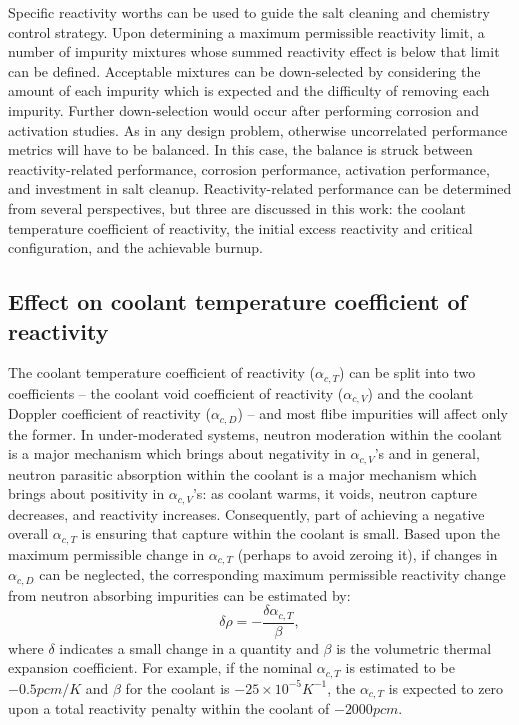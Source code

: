 \documentclass[11pt]{article}
\begin{document}
Specific reactivity worths can be used to guide the salt cleaning and chemistry control strategy.
Upon determining a maximum permissible reactivity limit, a number of impurity mixtures whose summed reactivity effect is below that limit can be defined.
Acceptable mixtures can be down-selected by considering the amount of each impurity which is expected and the difficulty of removing each impurity.
Further down-selection would occur after performing corrosion and activation studies.
As in any design problem, otherwise uncorrelated performance metrics will have to be balanced.
In this case, the balance is struck between reactivity-related performance, corrosion performance, activation performance, and investment in salt cleanup.
Reactivity-related performance can be determined from several perspectives, but three are discussed in this work: the coolant temperature coefficient of reactivity, the initial excess reactivity and critical configuration, and the achievable burnup.

\subsection{Effect on coolant temperature coefficient of reactivity}
\label{sec:exampleCoefficient}

The coolant temperature coefficient of reactivity ($\alpha_{c,T}$) can be split into two coefficients -- the coolant void coefficient of reactivity ($\alpha_{c,V}$) and the coolant Doppler coefficient of reactivity ($\alpha_{c,D}$) -- and most flibe impurities will affect only the former.
In under-moderated systems, neutron moderation within the coolant is a major mechanism which brings about negativity in $\alpha_{c,V}$'s and in general, neutron parasitic absorption within the coolant is a major mechanism which brings about positivity in $\alpha_{c,V}$'s: as coolant warms, it voids, neutron capture decreases, and reactivity increases.
Consequently, part of achieving a negative overall $\alpha_{c,T}$ is ensuring that capture within the coolant is small.
Based upon the maximum permissible change in $\alpha_{c,T}$ (perhaps to avoid zeroing it), if changes in $\alpha_{c,D}$ can be neglected, the corresponding maximum permissible reactivity change from neutron absorbing impurities can be estimated by:
\begin{equation}
    \delta\rho
    = -\frac{\delta\alpha_{c,T}}{\beta}
    ,
\end{equation}
where $\delta$ indicates a small change in a quantity and $\beta$ is the volumetric thermal expansion coefficient.
For example, if the nominal $\alpha_{c,T}$ is estimated to be $-0.5pcm/K$ and $\beta$ for the coolant is $-25\times10^{-5}K^{-1}$, the $\alpha_{c,T}$ is expected to zero upon a total reactivity penalty within the coolant of $-2000pcm$.
\end{document}
